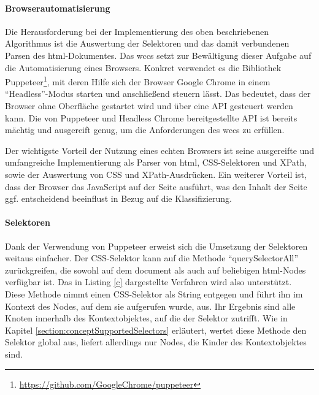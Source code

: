     \paragraph{Browserautomatisierung}
    Die Herausforderung bei der Implementierung des oben beschriebenen Algorithmus
    ist die Auswertung der Selektoren und das damit verbundenen Parsen des \gls{html}-Dokumentes.
    Das \gls{wccs} setzt zur Bewältigung dieser Aufgabe auf die Automatisierung eines Browsers.
    Konkret verwendet es die Bibliothek
    Puppeteer\footnote{\url{https://github.com/GoogleChrome/puppeteer}},
    mit deren Hilfe sich der Browser Google Chrome in einem "`Headless"'-Modus starten und anschließend steuern lässt.
    Das bedeutet, dass der Browser ohne Oberfläche gestartet wird und über eine API gesteuert werden kann.
    Die von Puppeteer und Headless Chrome bereitgestellte API ist bereits mächtig und ausgereift genug,
    um die Anforderungen des \gls{wccs} zu erfüllen.

    Der wichtigste Vorteil der Nutzung eines echten Browsers ist seine ausgereifte und umfangreiche Implementierung
    als Parser von \gls{html}, CSS-Selektoren und XPath, sowie der Auswertung von CSS und XPath-Ausdrücken.
    Ein weiterer Vorteil ist, dass der Browser das JavaScript auf der Seite ausführt,
    was den Inhalt der Seite ggf. entscheidend beeinflust in Bezug auf die Klassifizierung.

    \paragraph{Selektoren}
    Dank der Verwendung von Puppeteer erweist sich die Umsetzung der Selektoren weitaus einfacher.
    Der CSS-Selektor kann auf die Methode "`querySelectorAll"' zurückgreifen,
    die sowohl auf dem document als auch auf beliebigen \gls{html}-Nodes verfügbar ist.
    Das in Listing \ref{c} dargestellte Verfahren wird also unterstützt.
    Diese Methode nimmt einen CSS-Selektor als String entgegen und führt ihn im Kontext des
    Nodes, auf dem sie aufgerufen wurde, aus.
    Ihr Ergebnis sind alle Knoten innerhalb des Kontextobjektes,
    auf die der Selektor zutrifft.
    Wie in Kapitel \ref{section:conceptSupportedSelectors} erläutert,
    wertet diese Methode den Selektor global aus, liefert allerdings nur Nodes,
    die Kinder des Kontextobjektes sind.

